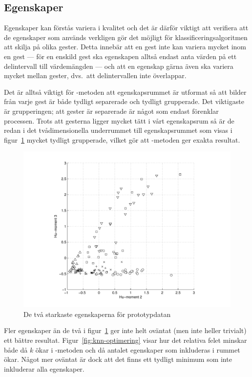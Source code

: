 \documentclass[../rapport_MVEX01-11-05]{subfiles}
\begin{document}
\subsection{Egenskaper}\label{sec:resultat_features}

Egenskaper kan förstås variera i kvalitet och det är därför viktigt att
verifiera att de egenskaper som används verkligen gör det möjligt för
klassificeringsalgoritmen att skilja på olika gester. Detta innebär att en
gest inte kan variera mycket inom en gest --- för en enskild gest ska 
egenskapen alltså endast anta värden på ett delintervall till värdemängden ---
och att en egenskap gärna även ska variera mycket mellan gester, dvs.~att
delintervallen inte överlappar.

Det är alltså viktigt för \knn-metoden att
egenskapsrummet är utformat så att bilder från varje gest är både tydligt
separerade och tydligt grupperade. Det viktigaste är grupperingen; att gester
är separerade är något som endast förenklar processen.
Trots att gesterna ligger mycket tätt i vårt egenskapsrum så är de redan i det
tvådimensionella underrummet till egenskapsrummet som visas i figur~\ref{fig:feats1011}
mycket tydligt grupperade, vilket gör att \knn-metoden ger exakta resultat.

\begin{figure}[tb]
  \centering
  \includegraphics[width=\textwidth,trim=2cm 0.5cm 2cm 0]{bilder/feats-10+11}
  \caption{De två starkaste egenskaperna för prototypdatan}
  \label{fig:feats1011}
\end{figure}

Fler egenskaper än de två i figur~\ref{fig:feats1011} ger inte helt oväntat
(men inte heller trivialt) ett bättre resultat. Figur~\ref{fig:knn-optimering} visar
hur det relativa felet minskar både då $k$ ökar i \knn-metoden och då antalet
egenskaper som inkluderas i rummet ökar. Något mer oväntat är dock att det
finns ett tydligt minimum som inte inkluderar alla egenskaper.
\end{document}
